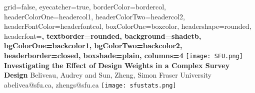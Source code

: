 \documentclass[paperwidth=58in,paperheight=47in,portrait]{baposter}
\begin{document}


\begin{poster}{
	grid=false,
	eyecatcher=true, 
	borderColor=bordercol,
	headerColorOne=headercol1,
	headerColorTwo=headercol2,
	headerFontColor=headerfontcol,
	boxColorOne=boxcolor,
	headershape=rounded,
	headerfont=\Large\sf\bf,
	textborder=rounded,
	background=shadetb,
	bgColorOne=backcolor1,
	bgColorTwo=backcolor2,
	headerborder=closed,
  boxshade=plain,
  columns=4
}
{
			\texttt{[image: SFU.png]}
}
{\sf\bf
	\color{titlecol}Investigating the Effect of Design Weights in a Complex Survey Design
}
{
	\vspace{1em} Beliveau, Audrey and Sun, Zheng, Simon Fraser University\\
	{\smaller abelivea@sfu.ca, zhengs@sfu.ca}
}
{
			\texttt{[image: sfustats.png]}
}


\end{poster}
\end{document}

